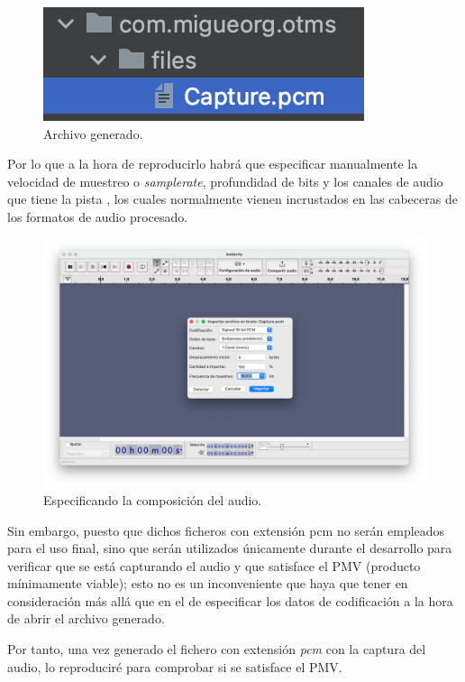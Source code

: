 \begin{figure}[htb]
    \centering
    \includegraphics{fotos/archivo_generado.png}
    \caption{Archivo generado.}
\end{figure}

\newpage
Por lo que a la hora de reproducirlo habrá que especificar manualmente la
velocidad de muestreo o \emph{samplerate}, profundidad de bits y los canales de
audio que tiene la pista \cite{audio-samplerate}, los cuales normalmente vienen
incrustados en las cabeceras de los formatos de audio procesado.

\begin{figure}[htb]
    \centering
    \includegraphics[width=\textwidth]{fotos/importando_datos_en_bruto_audacity.png}
    \caption{Especificando la composición del audio.}
\end{figure}

Sin embargo, puesto que dichos ficheros con extensión pcm no serán empleados para
el uso final, sino que serán utilizados únicamente durante el desarrollo
para verificar que se está capturando el audio y que satisface el PMV (producto
mínimamente viable); esto no es un inconveniente que haya que tener en
consideración más allá que en el de especificar los datos de codificación a la
hora de abrir el archivo generado. 

\newpage
Por tanto, una vez generado el fichero con
extensión \emph{pcm} con la captura del audio, lo reproduciré para comprobar si
se satisface el PMV. 

